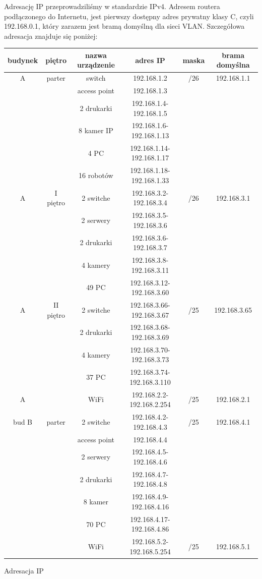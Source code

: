 \documentclass{article}
\begin{document}
Adresację IP przeprowadziliśmy w standardzie IPv4. Adresem routera podłączonego do Internetu, jest pierwszy dostępny adres prywatny klasy C, czyli 192.168.0.1, który zarazem jest bramą domyślną dla sieci VLAN.
Szczegółowa adresacja znajduje się poniżej:
\begin{Tabela}[!ht]
	\centering
	\begin{tabular}[!ht]{c|c|c|c|c|c}
	budynek &	piętro &	nazwa urządzenie & adres IP &maska&brama domyślna\\
	\hline
	A	& parter &	switch & 192.168.1.2&/26&192.168.1.1\\
	& &access point	& 192.168.1.3&&\\
	& &2 drukarki	& 192.168.1.4-192.168.1.5&&\\
	& & 8 kamer IP &	192.168.1.6-192.168.1.13&&\\
	& & 4 PC	& 192.168.1.14-192.168.1.17&&\\
	& & 16  robotów &	192.168.1.18-192.168.1.33&&\\ \hline
	
	A&I piętro	&2 switche	&192.168.3.2-192.168.3.4&/26&192.168.3.1\\
	&&2 serwery	&192.168.3.5-192.168.3.6&&\\
	&&2 drukarki&	192.168.3.6-192.168.3.7&&\\
	&&4 kamery	&192.168.3.8-192.168.3.11&&\\
	&&49 PC	&192.168.3.12-192.168.3.60&&\\
	\hline
	
	A &II piętro&	2 switche&	192.168.3.66-192.168.3.67&/25&192.168.3.65\\
	&&2 drukarki	&192.168.3.68-192.168.3.69&&\\
	&&4 kamery	&192.168.3.70-192.168.3.73&&\\
	&&37 PC	&192.168.3.74-192.168.3.110&&\\
	\hline
	A & &	WiFi	 &192.168.2.2-192.168.2.254&/25&192.168.2.1\\
	\hline
	\hline
	
	bud B &	parter&2 switche&	192.168.4.2-192.168.4.3&/25&192.168.4.1\\
	&& access point	&192.168.4.4&&\\
	&&2 serwery	&192.168.4.5-192.168.4.6&&\\
	&&2 drukarki&	192.168.4.7-192.168.4.8&&\\
	&&8 kamer	&192.168.4.9-192.168.4.16&&\\
	&&70 PC	&192.168.4.17-192.168.4.86&&\\
	\hline
	&&WiFi &	192.168.5.2-192.168.5.254&/25&192.168.5.1\\
	\hline
	
\end{tabular}
\caption{Adresacja IP}
\end{Tabela}
\newpage
\end{document}

